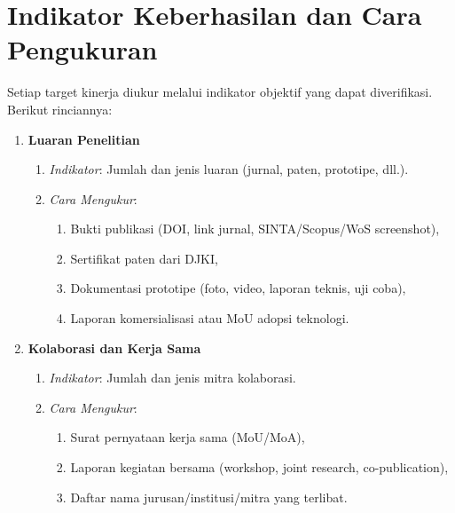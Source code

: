 \documentclass[12pt,a4paper]{article}
\begin{document}
\section{Indikator Keberhasilan dan Cara Pengukuran}

Setiap target kinerja diukur melalui indikator objektif yang dapat diverifikasi. Berikut rinciannya:

\begin{enumerate}[leftmargin=*]
    \item \textbf{Luaran Penelitian}
          \begin{enumerate}
              \item \textit{Indikator}: Jumlah dan jenis luaran (jurnal, paten, prototipe, dll.).
              \item \textit{Cara Mengukur}:
                    \begin{enumerate}
                        \item Bukti publikasi (DOI, link jurnal, SINTA/Scopus/WoS screenshot),
                        \item Sertifikat paten dari DJKI,
                        \item Dokumentasi prototipe (foto, video, laporan teknis, uji coba),
                        \item Laporan komersialisasi atau MoU adopsi teknologi.
                    \end{enumerate}
          \end{enumerate}

    \item \textbf{Kolaborasi dan Kerja Sama}
          \begin{enumerate}
              \item \textit{Indikator}: Jumlah dan jenis mitra kolaborasi.
              \item \textit{Cara Mengukur}:
                    \begin{enumerate}
                        \item Surat pernyataan kerja sama (MoU/MoA),
                        \item Laporan kegiatan bersama (workshop, joint research, co-publication),
                        \item Daftar nama jurusan/institusi/mitra yang terlibat.
                    \end{enumerate}
          \end{enumerate}


\end{enumerate}
\end{document}
